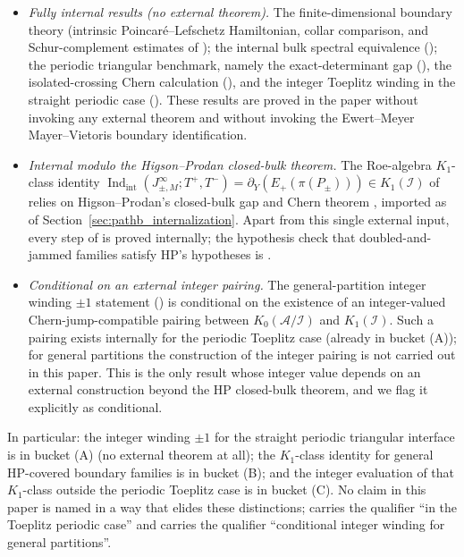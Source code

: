\documentclass[11pt]{article}
\numberwithin{equation}{section}
\theoremstyle{definition}
\theoremstyle{remark}
\newcommand{\Indint}{\operatorname{Ind}_{\mathrm{int}}}
\begin{document}
\begin{itemize}[leftmargin=2em]
\item[(A)] \emph{Fully internal results (no external theorem).} The finite-dimensional
boundary theory (intrinsic Poincar\'e--Lefschetz Hamiltonian, collar comparison, and
Schur-complement estimates of );
the internal bulk spectral equivalence
(); the periodic triangular benchmark, namely the
exact-determinant gap (), the isolated-crossing Chern
calculation (), and the integer Toeplitz winding in the
straight periodic case (). These
results are proved in the paper without invoking any external theorem and without invoking the
Ewert--Meyer Mayer--Vietoris boundary identification.
\item[(B)] \emph{Internal modulo the Higson--Prodan closed-bulk theorem.} The Roe-algebra
\(K_1\)-class identity \(\Indint(J_{\pm,M}^\infty;T^+,T^-)
=\partial_Y(E_+(\pi(P_\pm)))\in K_1(\mathcal I)\) of  relies on
Higson--Prodan's closed-bulk gap and Chern theorem
\cite{HigsonProdanUniversalPRL,HigsonProdanUniversalArxiv}, imported as
 of Section~\ref{sec:pathb_internalization}. Apart from this single
external input, every step of  is proved internally; the
hypothesis check that doubled-and-jammed families satisfy HP's hypotheses is
.
\item[(C)] \emph{Conditional on an external integer pairing.} The general-partition integer
winding \(\pm1\) statement () is conditional on the existence of
an integer-valued Chern-jump-compatible pairing between \(K_0(\mathcal A/\mathcal I)\) and
\(K_1(\mathcal I)\). Such a pairing exists internally for the periodic Toeplitz case (already
in bucket (A)); for general partitions the construction of the integer pairing is not carried
out in this paper. This is the only result whose integer value depends on an external
construction beyond the HP closed-bulk theorem, and we flag it explicitly as conditional.
\end{itemize}

\noindent
In particular: the integer winding \(\pm 1\) for the straight periodic triangular interface is
in bucket (A) (no external theorem at all); the \(K_1\)-class identity for general HP-covered
boundary families is in bucket (B); and the integer evaluation of that \(K_1\)-class outside
the periodic Toeplitz case is in bucket (C). No claim in this paper is named in a way that
elides these distinctions;  carries the qualifier ``in the Toeplitz
periodic case'' and  carries the qualifier ``conditional integer
winding for general partitions''.
\end{document}
